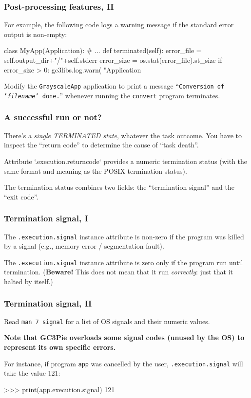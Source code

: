 \documentclass[english,serif,mathserif,xcolor=pdftex,dvipsnames,table]{beamer}
\begin{document}
\begin{frame}[fragile]
  \frametitle{Post-processing features, II}

  For example, the following code logs a warning message if the
  standard error output is non-empty:
\begin{python}
class MyApp(Application):
  # ...
  def terminated(self):
    error_file = self.output_dir+"/"+self.stderr
    error_size = os.stat(error_file).st_size
    if error_size > 0:
      gc3libs.log.warn(
        "Application %
\end{python}
\end{frame}


\begin{frame}
  \begin{exercise*}[2.D]

    Modify the \texttt{GrayscaleApp} application to print a message
    ``\texttt{Conversion of '\emph{filename}' done.}'' whenever
    running the \texttt{convert} program terminates.
  \end{exercise*}
\end{frame}


\begin{frame}
  \frametitle{A successful run or not?}

  There's a \emph{single TERMINATED state}, whatever the task outcome.
  You have to inspect the ``return code'' to determine the
  cause of ``task death''.

  \+
  Attribute `.execution.returncode` provides a numeric termination
  status (with the same format and meaning as the POSIX termination
  status).

  \+
  The termination status combines two fields: the ``termination
  signal'' and the ``exit code''.

\end{frame}

\begin{frame}[fragile]
  \frametitle{Termination signal, I}

  The \texttt{.execution.signal} instance attribute is non-zero if
  the program was killed by a signal (e.g., memory error / segmentation fault).

  \+
  The \texttt{.execution.signal} instance attribute is zero only if
  the program run until termination. (\textbf{Beware!} This does not
  mean that it run \emph{correctly}: just that it halted by itself.)
\end{frame}


\begin{frame}[fragile]
  \frametitle{Termination signal, II}

  Read \texttt{man 7 signal} for a list of OS signals and their
  numeric values.

  \+
  {\bfseries Note that GC3Pie overloads some signal codes (unused
    by the OS) to represent its own specific errors.}

  \+
  For instance, if program \texttt{app} was cancelled by the user,
  \texttt{.execution.signal} will take the value 121:
\begin{python}
>>> print(app.execution.signal)
121
\end{python}
\end{frame}
\end{document}

